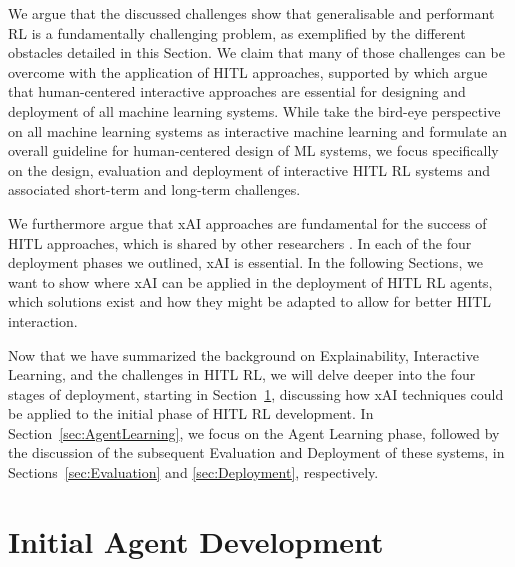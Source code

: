 \documentclass[twoside,11pt]{article}
\begin{document}
\begin{enumerate}
We argue that the discussed challenges show that generalisable and performant RL is a fundamentally challenging problem, as exemplified by the different obstacles detailed in this Section. We claim that many of those challenges can be overcome with the application of HITL approaches, supported by \citet{MatthewsonPilarski:2022:DesigningAndEvaluatingHCIML} which argue that human-centered interactive approaches are essential for designing and deployment of all machine learning systems. While \citet{MatthewsonPilarski:2022:DesigningAndEvaluatingHCIML} take the bird-eye perspective on all machine learning systems as interactive machine learning and formulate an overall guideline for human-centered design of ML systems, we focus specifically on the design, evaluation and deployment of interactive HITL RL systems and associated short-term and long-term challenges.

We furthermore argue that xAI approaches are fundamental for the success of HITL approaches, which is shared by other researchers \citep{heuillet2021explainability,milani2022survey}. In each of the four deployment phases we outlined, xAI is essential. In the following Sections, we want to show where xAI can be applied in the deployment of HITL RL agents, which solutions exist and how they might be adapted to allow for better HITL interaction.

Now that we have summarized the background on Explainability, Interactive Learning, and the challenges in HITL RL, we will delve deeper into the four stages of deployment, starting in Section~\ref{sec:Developing}, discussing how xAI techniques could be applied to the initial phase of HITL RL development. In Section~\ref{sec:AgentLearning}, we focus on the Agent Learning phase, followed by the discussion of the subsequent Evaluation and Deployment of these systems, in Sections~\ref{sec:Evaluation} and \ref{sec:Deployment}, respectively.


\section{Initial Agent Development}
\label{sec:Developing}


\end{enumerate}
\end{document}
